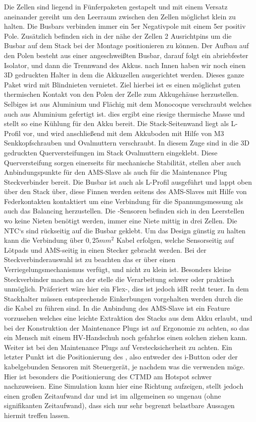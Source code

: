 Die Zellen sind liegend in Fünferpaketen gestapelt und mit einem Versatz aneinander gereiht um den Leerraum zwischen den Zellen möglichst klein zu halten. Die Busbars verbinden immer ein 5er Negativpole mit einem 5er positiv Pole. Zusätzlich befinden sich in der nähe der Zellen 2 Ausrichtpins um die Busbar auf dem Stack bei der Montage positionieren zu können. Der Aufbau auf den Polen besteht aus einer angeschweißten Busbar, darauf folgt ein abriebfester Isolator, und dann die Trennwand des Akkus. nach Innen haben wir noch einen 3D gedruckten Halter in dem die Akkuzellen ausgerichtet werden. Dieses ganze Paket wird mit Blindnieten vernietet. Ziel hierbei ist es einen möglichst guten thermischen Kontakt von den Polen der Zelle zum Akkugehäuse herzustellen. Selbiges ist aus Aluminium und Flächig mit dem Monocoque verschraubt welches auch aus Aluminium gefertigt ist. dies ergibt eine riesige thermische Masse und stellt so eine Kühlung für den Akku bereit. Die Stack-Seitenwand liegt als L-Profil vor, und wird anschließend mit dem Akkuboden mit Hilfe von M3 Senkkopfschrauben und Ovalmuttern verschraubt. In diesem Zuge sind in die 3D gedruckten Querversteifungen im Stack Ovalmuttern eingeklebt. Diese Querversteifung sorgen einerseits für mechanische Stabilität, stellen aber auch Anbindungspunkte für den \ac{AMS}-Slave als auch für die Maintenance Plug Steckverbinder bereit. Die Busbar ist auch als L-Profil ausgeführt und lappt oben über den Stack über, diese Finnen werden seitens des \ac{AMS}-Slaves mit Hilfe von Federkontakten kontaktiert um eine Verbindung für die Spannungsmessung als auch das Balancing herzustellen. Die -Sensoren befinden sich in den Leerstellen wo keine Nieten benötigt werden, immer eine Niete mittig in drei Zellen. Die \ac{NTC}`s sind rückseitig auf die Busbar geklebt. Um das Design günstig zu halten kann die Verbindung über \ensuremath{0,25mm^2} Kabel erfolgen, welche Sensorseitig auf Lötpads und \ac{AMS}-seitig in einen Stecker gebracht werden. Bei der Steckverbinderauswahl ist zu beachten das er über einen Verriegelungsmechanismus verfügt, und nicht zu klein ist. Besonders kleine Steckverbinder machen an der stelle die Verarbeitung schwer oder praktisch unmöglich. Präferiert wäre hier ein Flex-, dies ist jedoch \ac{idR} recht teuer. In dem Stackhalter müssen entsprechende Einkerbungen vorgehalten werden durch die die Kabel zu führen sind. In die Anbindung des \ac{AMS}-Slave ist ein Feature vorzusehen welches eine leichte Extraktion des Stacks aus dem Akku erlaubt, und bei der Konstruktion der Maintenance Plugs ist auf Ergonomie zu achten, so das ein Mensch mit einem \ac{HV}-Handschuh noch gefahrlos einen solchen ziehen kann. Weiter ist bei den Maintenance Plugs auf Verstecksicherheit zu achten. Ein letzter Punkt ist die Positionierung des , also entweder des i-Button oder der kabelgebunden Sensoren mit Steuergerät, je nachdem was die  verwenden möge. Hier ist besonders die Positionierung des \ac{CTMD} am Hotspot schwer nachzuweisen. Eine Simulation kann hier eine Richtung aufzeigen, stellt jedoch einen großen Zeitaufwand dar und ist im allgemeinen so ungenau (ohne signifikanten Zeitaufwand), dass sich nur sehr begrenzt belastbare Aussagen hiermit treffen lassen.

